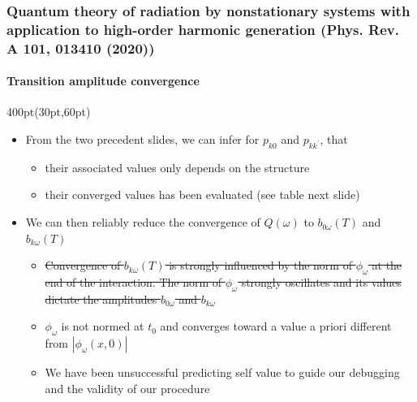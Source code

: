 \begin{frame}
\frametitle{Quantum theory of radiation by nonstationary systems 
        with application to high-order harmonic generation
        (Phys. Rev. A 101, 013410 (2020))}
        \framesubtitle{Transition amplitude convergence}

\begin{textblock*}{400pt}(30pt,60pt)
\small

\begin{itemize}
\footnotesize
\item From the two precedent slides, we can infer for 
$p_{k0}$ and $p_{kk^\prime}$, that
\begin{itemize}
\footnotesize
\item[$\bullet$] their associated values only depends on the structure
\item[$\bullet$] their converged values has been evaluated 
(see table next slide)
\end{itemize}
\item We can then reliably reduce the convergence of 
$Q(\omega)$ to $b_{0\omega}(T)$ and $b_{k\omega}(T)$ 
\begin{itemize}
\footnotesize
\item[$\bullet$] \sout{Convergence of 
$b_{k\omega}(T)$ is strongly influenced by
the norm of $\phi_{\omega}$ at the end of the interaction.
The norm of $\phi_{\omega}$ strongly oscillates
and its values dictate the amplitudes $b_{0\omega}$ and $b_{k\omega}$}
\item[$\bullet$] $\phi_{\omega}$ is not normed at $t_0$ and converges toward 
a value a priori different from $|\phi_\omega(x,0)|$
\item[$\bullet$] We have been unsuccessful predicting self value to guide
our debugging and the validity of our procedure
\end{itemize}
\end{itemize}
\end{textblock*}



\end{frame}




